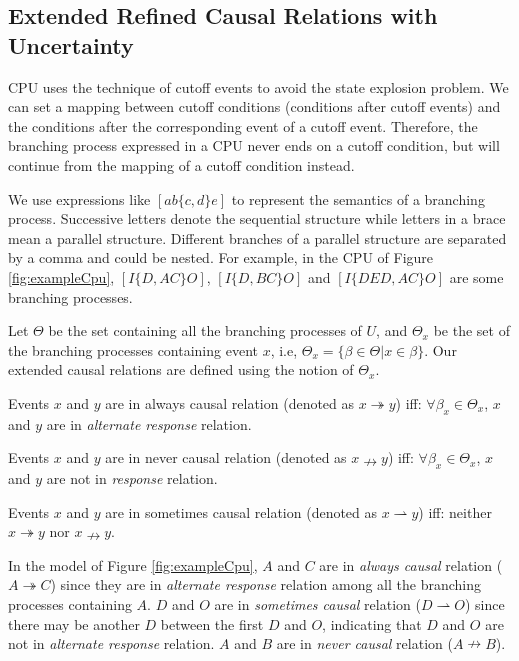 \documentclass[dvips,...]{llncs}
\begin{document}
\subsection{Extended Refined Causal Relations with Uncertainty}\label{subsec:causalAndInverseCausal}
CPU uses the technique of cutoff events to avoid the state explosion problem. We can set a mapping between cutoff conditions (conditions after cutoff events) and the conditions after the corresponding event of a cutoff event. Therefore, the branching process expressed in a CPU never ends on a cutoff condition, but will continue from the mapping of a cutoff condition instead.

We use expressions like $[ab\{c,d\}e]$ to represent the semantics of a branching process. Successive letters denote the sequential structure while letters in a brace mean a parallel structure. Different branches of a parallel structure are separated by a comma and could be nested. For example, in the CPU of Figure \ref{fig:exampleCpu}, $[I\{D,AC\}O]$, $[I\{D,BC\}O]$ and $[I\{DED,AC\}O]$ are some branching processes.

Let $\Theta$ be the set containing all the branching processes of $U$, and $\Theta_{x}$ be the set of the branching processes containing event $x$, i.e, $\Theta_{x}=\{\beta\in\Theta|x\in\beta\}$. Our extended causal relations are defined using the notion of $\Theta_{x}$.

\begin{definition}\label{def:alwaysCausal}
Events $x$ and $y$ are in always causal relation (denoted as $x\twoheadrightarrow y$) iff: $\forall\beta_{x}\in\Theta_{x}$, $x$ and $y$ are in \textit{alternate response} relation.
\end{definition}

\begin{definition}\label{def:neverCausal}
Events $x$ and $y$ are in never causal relation (denoted as $x\nrightarrow y$) iff: $\forall\beta_{x}\in\Theta_{x}$, $x$ and $y$ are not in \textit{response} relation.
\end{definition}

\begin{definition}\label{def:sometimesCausal}
Events $x$ and $y$ are in sometimes causal relation (denoted as $x\rightharpoonup y$) iff: neither $x\twoheadrightarrow y$ nor $x\nrightarrow y$.
\end{definition}

\begin{example}\label{ex:causalRelation}
In the model of Figure \ref{fig:exampleCpu}, $A$ and $C$ are in \textit{always causal} relation ($A\twoheadrightarrow C$) since they are in \textit{alternate response} relation among all the branching processes containing $A$. $D$ and $O$ are in \textit{sometimes causal} relation ($D\rightharpoonup O$) since there may be another $D$ between the first $D$ and $O$, indicating that $D$ and $O$ are not in \textit{alternate response} relation. $A$ and $B$ are in \textit{never causal} relation ($A\nrightarrow B$).
\end{example}
\end{document}
